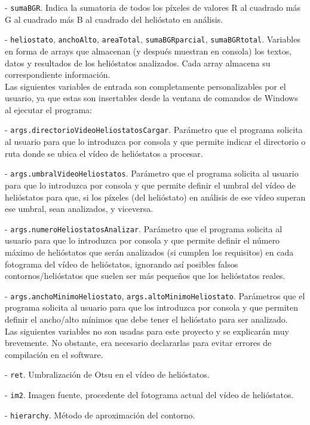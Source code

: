 - \verb|sumaBGR|. Indica la sumatoria de todos los píxeles de valores R al cuadrado más G al cuadrado más B al cuadrado del helióstato en análisis.

- \verb|heliostato|, \verb|anchoAlto|, \verb|areaTotal|, \verb|sumaBGRparcial|, \verb|sumaBGRtotal|. Variables en forma de arrays que almacenan (y después muestran en consola) los textos, datos y resultados de los helióstatos analizados. Cada array almacena su correspondiente información.\\[20pt]

Las siguientes variables de entrada son completamente personalizables por el usuario, ya que estas son insertables desde la ventana de comandos de Windows al ejecutar el programa:

- \verb|args.directorioVideoHeliostatosCargar|. Parámetro que el programa solicita al usuario para que lo introduzca por consola y que permite indicar el directorio o ruta donde se ubica el vídeo de helióstatos a procesar.

- \verb|args.umbralVideoHeliostatos|. Parámetro que el programa solicita al usuario para que lo introduzca por consola y que permite definir el umbral del vídeo de helióstatos para que, si los píxeles (del helióstato) en análisis de ese vídeo superan ese umbral, sean analizados, y viceversa.

- \verb|args.numeroHeliostatosAnalizar|. Parámetro que el programa solicita al usuario para que lo introduzca por consola y que permite definir el número máximo de helióstatos que serán analizados (si cumplen los requisitos) en cada fotograma del vídeo de helióstatos, ignorando así posibles falsos contornos/helióstatos que suelen ser más pequeños que los helióstatos reales.

- \verb|args.anchoMinimoHeliostato|, \verb|args.altoMinimoHeliostato|. Parámetros que el programa solicita al usuario para que los introduzca por consola y que permiten definir el ancho/alto mínimos que debe tener el helióstato para ser analizado.\\[20pt]

Las siguientes variables no son usadas para este proyecto y se explicarán muy brevemente. No obstante, era necesario declararlas para evitar errores de compilación en el software.

- \verb|ret|. Umbralización de Otsu en el vídeo de helióstatos.

- \verb|im2|. Imagen fuente, procedente del fotograma actual del vídeo de helióstatos.

- \verb|hierarchy|. Método de aproximación del contorno.\\[20pt]

